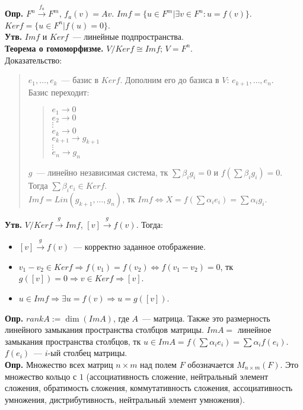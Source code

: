 \documentclass{article}
\begin{document}
	\textbf{Опр.} $F^n \xrightarrow{f_a} F^m$, $f_a (v) = Av$. $Im f = \{ u \in F^m | \exists v \in F^n : u = f(v) \}$. $Ker f = \{ u \in F^n | f(u) = 0 \}$. \\
	\textbf{Утв.} $Im f$ и $Ker f$~--- линейные подпространства. \\
	\textbf{Теорема о гомоморфизме.} $V / Ker f \cong Im f$; $V = F^n$. \\
	Доказательство:
	\begin{quote}
		$e_1, \dots, e_k$~--- базис в $Ker f$. Дополним его до базиса в $V$: $e_{k + 1}, \dots, e_n$. \\
		Базис переходит:
		\begin{quote}
			$e_1 \rightarrow 0$ \\
			$e_2 \rightarrow 0$ \\
			$\vdots$ \\
			$e_k \rightarrow 0$ \\
			$e_{k + 1} \rightarrow g_{k + 1}$ \\
			$\vdots$ \\
			$e_n \rightarrow g_n$
		\end{quote}
		$g$~--- линейно независимая система, тк $\sum \beta_i g_i = 0$ и $f(\sum \beta_i g_i) = 0$. Тогда $\sum \beta_i e_i \in Ker f$. \\
		$Im f = Lin(g_{k + 1}, \dots, g_n)$, тк $Im f \Leftrightarrow X = f (\sum \alpha_i e_i) = \sum \alpha_i g_i$.
	\end{quote}
	\textbf{Утв.} $V / Ker f \xrightarrow{g} Im f$, $[v] \xrightarrow{g} f(v)$. Тогда:
	\begin{itemize}
		\item $[v] \xrightarrow{g} f(v)$~--- корректно заданное отображение.
		\item $v_1 - v_2 \in Ker f \Rightarrow f(v_1) = f(v_2) \Leftrightarrow f(v_1 - v_2) = 0$, тк $g([v]) = 0 \Rightarrow v \in Ker f \Rightarrow [v]$.
		\item $u \in Im f \Rightarrow \exists u = f(v) \Rightarrow u = g([v])$.
	\end{itemize}
	\textbf{Опр.} $rank A := \dim(Im A)$, где $A$~--- матрица. Также это размерность линейного замыкания пространства столбцов матрицы. $Im A = $ линейное замыкания пространства столбцов, тк $u \in Im A = f(\sum \alpha_i e_i) = \sum \alpha_i f(e_i)$. $f(e_i)$~--- $i$-ый столбец матрицы. \\
	\textbf{Опр.} Множество всех матриц $n \times m$ над полем $F$ обозначается $M_{n \times m}(F)$. Это множество кольцо с $1$ (ассоциативность сложение, нейтральный элемент сложения, обратимость сложения, коммутативность сложения, ассоциативность умножения, дистрибутивность, нейтральный элемент умножения). \\
\end{document}
